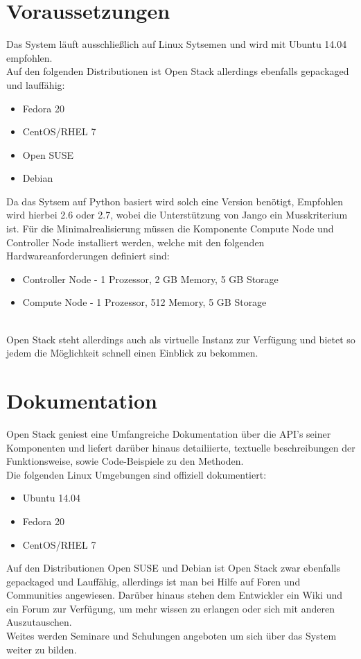 \documentclass[a4paper,nochapterprefix,english,12pt]{scrreprt}
\begin{document}
\section{Voraussetzungen}
Das System läuft ausschließlich auf Linux Sytsemen und wird mit Ubuntu 14.04 empfohlen.\\
Auf den folgenden Distributionen ist Open Stack allerdings ebenfalls gepackaged und lauffähig:
\begin{itemize}
	\item Fedora 20
	\item CentOS/RHEL 7
	\item Open SUSE
	\item Debian
\end{itemize}
Da das Sytsem auf Python basiert wird solch eine Version benötigt, Empfohlen wird hierbei 2.6 oder 2.7, wobei die Unterstützung von Jango ein Musskriterium ist.
Für die Minimalrealisierung müssen die Komponente Compute Node und Controller Node installiert werden, welche mit den folgenden Hardwareanforderungen definiert sind:\\
\begin{itemize}
	\item Controller Node - 1 Prozessor, 2 GB Memory, 5 GB Storage
	\item Compute Node - 1 Prozessor, 512 Memory, 5 GB Storage\\\\
\end{itemize}
Open Stack steht allerdings auch als virtuelle Instanz zur Verfügung und bietet so jedem die Möglichkeit schnell einen Einblick zu bekommen. \cite{OS-BasicEnvironment} 
\section{Dokumentation}
Open Stack geniest eine Umfangreiche Dokumentation über die API's seiner Komponenten und liefert darüber hinaus detailiierte, textuelle beschreibungen der Funktionsweise, sowie Code-Beispiele zu den Methoden.\\
Die folgenden Linux Umgebungen sind offiziell dokumentiert:
\begin{itemize}
	\item Ubuntu 14.04
	\item Fedora 20
	\item CentOS/RHEL 7
\end{itemize}
Auf den Distributionen Open SUSE und Debian ist Open Stack zwar ebenfalls gepackaged und Lauffähig, allerdings ist man bei Hilfe auf Foren und Communities angewiesen.
Darüber hinaus stehen dem Entwickler ein Wiki und ein Forum zur Verfügung, um mehr wissen zu erlangen oder sich mit anderen Auszutauschen.\\
Weites werden Seminare und Schulungen angeboten um sich über das System weiter zu bilden. \cite{OS-Docs}
\end{document}
